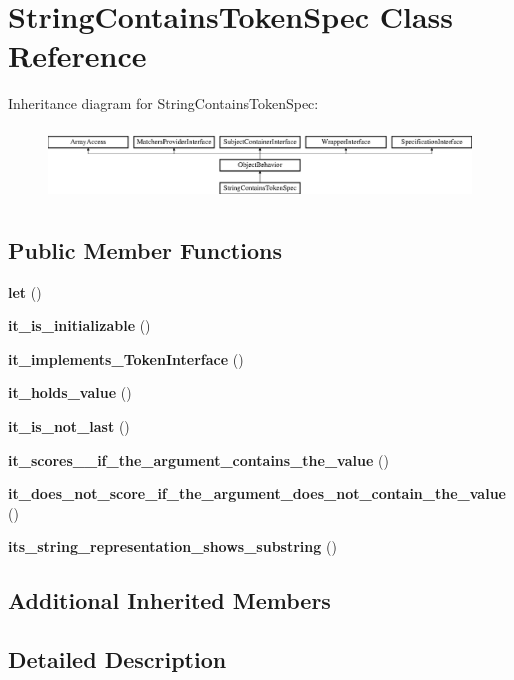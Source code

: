 \section{String\+Contains\+Token\+Spec Class Reference}
\label{classspec_1_1_prophecy_1_1_argument_1_1_token_1_1_string_contains_token_spec}
Inheritance diagram for String\+Contains\+Token\+Spec\+:\begin{figure}[H]
\begin{center}
\leavevmode
\includegraphics[height=1.953488cm]{classspec_1_1_prophecy_1_1_argument_1_1_token_1_1_string_contains_token_spec}
\end{center}
\end{figure}
\subsection*{Public Member Functions}
\begin{DoxyCompactItemize}
\item 
{\bf let} ()
\item 
{\bf it\+\_\+is\+\_\+initializable} ()
\item 
{\bf it\+\_\+implements\+\_\+\+Token\+Interface} ()
\item 
{\bf it\+\_\+holds\+\_\+value} ()
\item 
{\bf it\+\_\+is\+\_\+not\+\_\+last} ()
\item 
{\bf it\+\_\+scores\+\_\+\_\+if\+\_\+the\+\_\+argument\+\_\+contains\+\_\+the\+\_\+value} ()
\item 
{\bf it\+\_\+does\+\_\+not\+\_\+score\+\_\+if\+\_\+the\+\_\+argument\+\_\+does\+\_\+not\+\_\+contain\+\_\+the\+\_\+value} ()
\item 
{\bf its\+\_\+string\+\_\+representation\+\_\+shows\+\_\+substring} ()
\end{DoxyCompactItemize}
\subsection*{Additional Inherited Members}


\subsection{Detailed Description}


